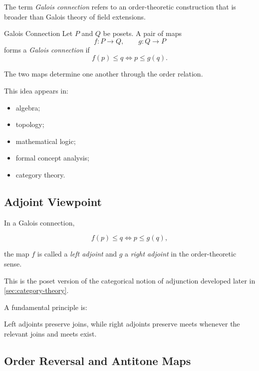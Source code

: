 The term \emph{Galois connection} refers to an order-theoretic construction
that is broader than Galois theory of field extensions.

\begin{definitionbox}{Galois Connection}
Let \(P\) and \(Q\) be posets. A pair of maps
\[ f:P\to Q,\qquad g:Q\to P \]
forms a \emph{Galois connection} if
\[ f(p)\leq q\iff p\leq g(q). \]
\end{definitionbox}

The two maps determine one another through the order relation.

This idea appears in:

\begin{itemize}
    \item algebra;
    \item topology;
    \item mathematical logic;
    \item formal concept analysis;
    \item category theory.
\end{itemize}

\subsection{Adjoint Viewpoint}
\label{subsec:lattice-adjoint-viewpoint}

In a Galois connection,

\[ f(p)\leq q\iff p\leq g(q), \]

the map \(f\) is called a \emph{left adjoint} and \(g\) a \emph{right
adjoint} in the order-theoretic sense.

This is the poset version of the categorical notion of adjunction developed
later in \cref{sec:category-theory}.

A fundamental principle is:

\begin{importantbox}
Left adjoints preserve joins, while right adjoints preserve meets whenever
the relevant joins and meets exist.
\end{importantbox}

\subsection{Order Reversal and Antitone Maps}
\label{subsec:antitone-maps}

